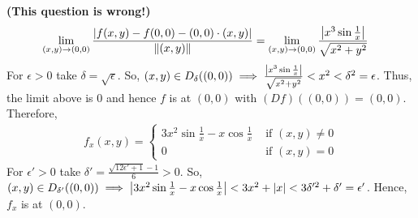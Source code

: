 \begin{soln}{5}
   \textbf{(This question is wrong!)}
    \\ 
    \begin{align*}
       \lim_{(x,y) \to (0,0)} \frac{\left| {f(x,y)-f(0,0)-(0,0)\cdot (x,y)} \right|}{\norm{(x,y)}}
       &= \lim_{(x,y) \to (0,0)} \frac{\left| {x^3\sin{\frac{1}{x}}} \right|}{\sqrt{x^2+y^2}}
    \end{align*}
    For $ \epsilon > 0 $ take $ \delta = \sqrt{\epsilon} $. So, $ (x,y) \in D_{\delta}((0,0)) \implies \frac{\left| {x^3\sin{\frac{1}{x}}} \right|}{\sqrt{x^2+y^2}} < x^2 < \delta^2 = \epsilon $. Thus, the limit above is $ 0 $ and hence $ f $ is \diff at $ (0,0) $ with $ (Df)((0,0)) = (0,0) $. Therefore,
    \begin{align*}
       f_x(x,y) =  \begin{cases}
        3x^2\sin{\frac{1}{x}} - x\cos{\frac{1}{x}} & \text{ if } (x,y) \not = 0 \\ 
        0 & \text{ if } (x,y) = 0
       \end{cases}
    \end{align*}
    For $ \epsilon' > 0 $ take $ \delta' = \frac{\sqrt{12\epsilon'+1}-1}{6} > 0 $. So, $ (x,y) \in D_{\delta'}((0,0)) \implies \left| {3x^2\sin{\frac{1}{x}} - x\cos{\frac{1}{x}}} \right| < 3x^2+|x| < 3\delta'^2+\delta' = \epsilon' $. Hence, $ f_x $ is \cts at $ (0,0) $.
\end{soln}